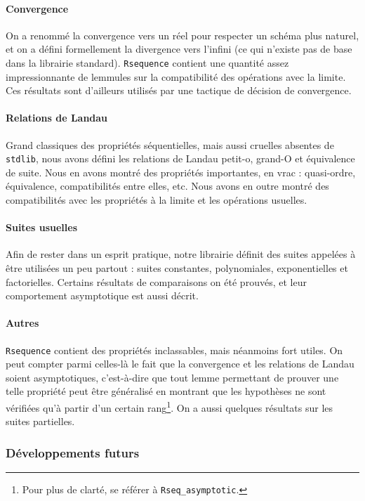 \documentclass{article}
\newcommand{\coqcode}[1]{\texttt{#1}}
\begin{document}
\paragraph{Convergence} On a renommé la convergence vers un réel pour respecter un schéma plus naturel, et on a défini formellement la divergence vers l'infini (ce qui n'existe pas de base dans la librairie standard). \coqcode{Rsequence} contient une quantité assez impressionnante de lemmules sur la compatibilité des opérations avec la limite. Ces résultats sont d'ailleurs utilisés par une tactique de décision de convergence.

\paragraph{Relations de Landau} Grand classiques des propriétés séquentielles, mais aussi cruelles absentes de \coqcode{stdlib}, nous avons défini les relations de Landau petit-o, grand-O et équivalence de suite. Nous en avons montré des propriétés importantes, en vrac : quasi-ordre, équivalence, compatibilités entre elles, etc. Nous avons en outre montré des compatibilités avec les propriétés à la limite et les opérations usuelles.

\paragraph{Suites usuelles} Afin de rester dans un esprit pratique, notre librairie définit des suites appelées à être utilisées un peu partout : suites constantes, polynomiales, exponentielles et factorielles. Certains résultats de comparaisons on été prouvés, et leur comportement asymptotique est aussi décrit.

\paragraph{Autres} \coqcode{Rsequence} contient des propriétés inclassables, mais néanmoins fort utiles. On peut compter parmi celles-là le fait que la convergence et les relations de Landau soient asymptotiques, c'est-à-dire que tout lemme permettant de prouver une telle propriété peut être généralisé en montrant que les hypothèses ne sont vérifiées qu'à partir d'un certain rang\footnote{Pour plus de clarté, se référer à \coqcode{Rseq\_asymptotic}.}. On a aussi quelques résultats sur les suites partielles.

\subsubsection{Développements futurs}
\end{document}
